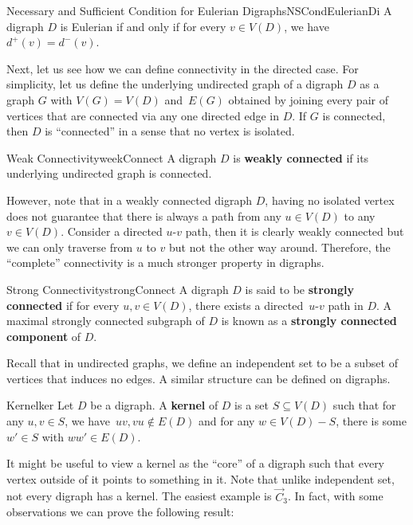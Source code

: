\documentclass[math]{amznotes}
\theoremstyle{remark}
\newcommand{\0}{\mathbf{0}}
\newcommand{\1}{\mathbf{1}}
\begin{document}
\begin{probox}{Necessary and Sufficient Condition for Eulerian Digraphs}{NSCondEulerianDi}
    A digraph $D$ is Eulerian if and only if for every $v \in V(D)$, we have $d^+(v) = d^-(v)$.
\end{probox}
Next, let us see how we can define connectivity in the directed case. For simplicity, let us define the underlying undirected graph of a digraph $D$ as a graph $G$ with $V(G) = V(D)$ and~$E(G)$ obtained by joining every pair of vertices that are connected via any one directed edge in $D$. If $G$ is connected, then $D$ is ``connected'' in a sense that no vertex is isolated.
\begin{dfnbox}{Weak Connectivity}{weekConnect}
    A digraph $D$ is {\color{red} \textbf{weakly connected}} if its underlying undirected graph is connected.
\end{dfnbox}
However, note that in a weakly connected digraph $D$, having no isolated vertex does not guarantee that there is always a path from any $u \in V(D)$ to any $v \in V(D)$. Consider a directed $u$-$v$ path, then it is clearly weakly connected but we can only traverse from $u$ to $v$ but not the other way around. Therefore, the ``complete'' connectivity is a much stronger property in digraphs.
\begin{dfnbox}{Strong Connectivity}{strongConnect}
    A digraph $D$ is said to be {\color{red} \textbf{strongly connected}} if for every $u, v \in V(D)$, there exists a directed~$u$-$v$ path in $D$. A maximal strongly connected subgraph of $D$ is known as a {\color{red} \textbf{strongly connected component}} of $D$.
\end{dfnbox}
Recall that in undirected graphs, we define an independent set to be a subset of vertices that induces no edges. A similar structure can be defined on digraphs.
\begin{dfnbox}{Kernel}{ker}
    Let $D$ be a digraph. A {\color{red} \textbf{kernel}} of $D$ is a set $S \subseteq V(D)$ such that for any $u, v \in S$, we have~$uv, vu \notin E(D)$ and for any $w \in V(D) - S$, there is some $w' \in S$ with $ww' \in E(D)$.
\end{dfnbox}
It might be useful to view a kernel as the ``core'' of a digraph such that every vertex outside of it points to something in it. Note that unlike independent set, not every digraph has a kernel. The easiest example is $\overrightarrow{C}_3$. In fact, with some observations we can prove the following result:
\end{document}
